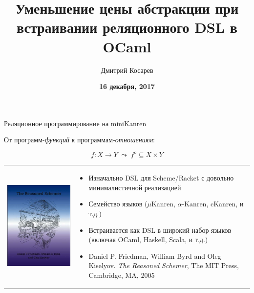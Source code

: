 \documentclass[10pt, mathserif]{beamer}
\title{Уменьшение цены абстракции при встраивании реляционного DSL в OCaml}
\author{Дмитрий Косарев}
\institute[]{
\small{
\textbf{Санкт-Петербургский Государтсвенный Университет} \\
\textbf{JetBrains Research}
}
}
\date{
  \vskip 2cm
  \small{
  \textbf{16 декабря, 2017}
  }
}
\newcommand{\oo}[1]{{#1}^o}
\theoremstyle{definition}
\begin{document}
\begin{frame}
  \titlepage
\end{frame}

\begin{frame}{Реляционное программирование на miniKanren}
 \begin{center}
 От программ-\emph{функций} к программам-\emph{отношениям}:
 \end{center}

 $$
 f \colon X \to Y\;\leadsto\;\oo{f} \subseteq X\times Y
 $$
 \vskip5mm
 \begin{tabular}{m{4cm}m{6cm}}
    \includegraphics[scale=0.3]{trs.jpg} &
    \begin{itemize}
       \item Изначально DSL для Scheme/Racket с довольно минималистичной реализацией
       \item Семейство языков ($\mu$Kanren, $\alpha$-Kanren, cKanren, и т.д.)
       \item Встраивается как DSL в широкий набор языков (включая OCaml, Haskell, Scala, и т.д.)
       \item Daniel P. Friedman, William Byrd and   Oleg Kiselyov. \emph{The Reasoned Schemer},
       The MIT Press, Cambridge, MA, 2005
    \end{itemize}
 \end{tabular}
 \vskip 3cm
\end{frame}
\end{document}
